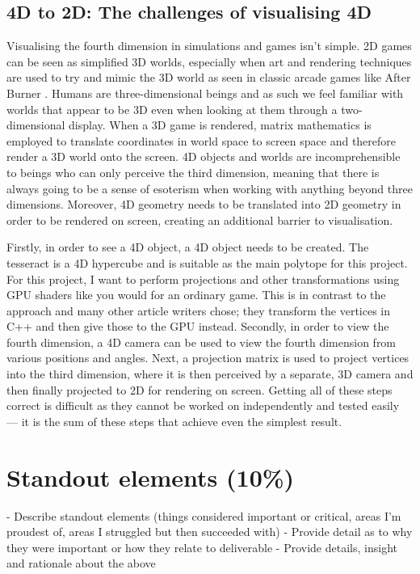 \documentclass[11pt, a4paper]{article}
\begin{document}
\subsection{4D to 2D: The challenges of visualising 4D}

Visualising the fourth dimension in simulations and games isn't simple. 2D games can be seen as simplified 3D worlds, especially when art and rendering techniques are used to try and mimic the 3D world as seen in classic arcade games like After Burner \parencite{afterburner}. Humans are three-dimensional beings and as such we feel familiar with worlds that appear to be 3D even when looking at them through a two-dimensional display. When a 3D game is rendered, matrix mathematics is employed to translate coordinates in world space to screen space and therefore render a 3D world onto the screen. 4D objects and worlds are incomprehensible to beings who can only perceive the third dimension, meaning that there is always going to be a sense of esoterism when working with anything beyond three dimensions. Moreover, 4D geometry needs to be translated into 2D geometry in order to be rendered on screen, creating an additional barrier to visualisation.

Firstly, in order to see a 4D object, a 4D object needs to be created. The tesseract is a 4D hypercube and is suitable as the main polytope for this project. For this project, I want to perform projections and other transformations using GPU shaders like you would for an ordinary game. This is in contrast to the approach \citeauthor*{hollasch1991four} \parencite*{hollasch1991four} and many other article writers chose; they transform the vertices in C++ and then give those to the GPU instead. Secondly, in order to view the fourth dimension, a 4D camera can be used to view the fourth dimension from various positions and angles. Next, a projection matrix is used to project vertices into the third dimension, where it is then perceived by a separate, 3D camera and then finally projected to 2D for rendering on screen. Getting all of these steps correct is difficult as they cannot be worked on independently and tested easily --- it is the sum of these steps that achieve even the simplest result. 

\section{Standout elements (10\%)}

- Describe standout elements (things considered important or critical, areas I'm proudest of, areas I struggled but then succeeded with)
- Provide detail as to why they were important or how they relate to deliverable
- Provide details, insight and rationale about the above
\end{document}
